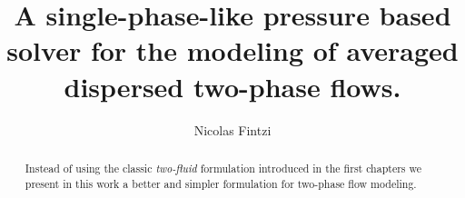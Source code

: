 \documentclass[12pt]{My_preprint}
\title{A single-phase-like pressure based solver for the modeling of averaged dispersed two-phase flows.  }
\author[1,2]{Nicolas Fintzi}
\begin{document}
\maketitle

\begin{abstract}
    Instead of using the classic \textit{two-fluid} formulation introduced in the first chapters we present in this work a better and simpler formulation for two-phase flow modeling. 
\end{abstract}



\appendix
\end{document}
